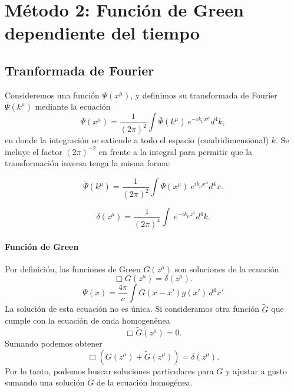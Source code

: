 \chapter{Método 2: Función de Green dependiente del tiempo}
\section{Tranformada de Fourier}

 Consideremos una función $\Psi(x^\mu)  $,
 y definimos su transformada de Fourier $\bar{\Psi}(k^\mu)$ mediante
 la ecuación%
 \begin{equation}
 \Psi(x^\mu)  =\frac{1}{(2\pi)^2}\int \bar\Psi(k^\mu)
 ~e^{-ik_\mu x^\mu }d^4k,
 \end{equation}
 en donde la integración se extiende a todo el espacio
 (cuadridimensional) $k$. Se incluye el factor $(2\pi)
 ^{-2}$ en frente a la integral
 para permitir que la transformación inversa tenga la misma forma:%

 \begin{equation}
 \bar{\Psi}(k^\mu)  =\frac{1}{(2\pi)^2}\int \Psi(x^\mu)
 ~e^{ik_\mu x^\mu }d^4x.
 \end{equation}

 \begin{equation}
 \delta(z^\mu) =\frac{1}{(2\pi)^4}\int~e^{-ik_\mu z^\mu }d^4k.
 \end{equation}

 \subsubsection{Función de Green}

 Por definición, las funciones de Green $G(z^\mu)$ son soluciones de la ecuación
 \begin{equation}
 \Box G(z^\mu)  =\delta(z^\mu)  .
 \end{equation}
 \begin{equation}
 \Psi (x)=\frac{4\pi}{c}\int G\left(x-x'\right) g(x')\,d^4x'
 \end{equation}
 La solución de esta ecuación no es única. Si consideramos otra
 función $\tilde{G}$ que cumple con la ecuación de onda homogenénea
 \begin{equation}
 \Box\tilde{G}(z^\mu)  =0.
 \end{equation}
 Sumando podemos obtener%
 \begin{equation}
 \Box\left(  G(z^\mu)  +\tilde{G}\left(
 z^\mu \right) \right)  =\delta(z^\mu)  .
 \end{equation}
 Por lo tanto, podemos buscar soluciones particulares para $G$ y
 ajustar a gusto sumando una solución $\tilde{G}$ de la
 ecuación homogénea.


